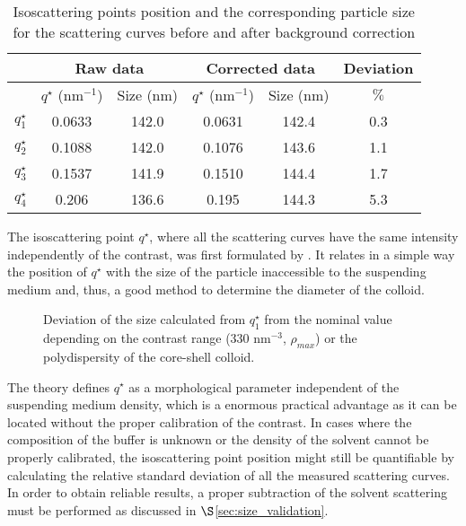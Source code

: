 \begin{table}
	\centering
	\begin{tabular}{l||cc|cc|c}
		 & \multicolumn{2}{c}{Raw data} & \multicolumn{2}{c}{Corrected data} & Deviation\\
		 \hline
		 & \( q^{\star} \) (nm\(^{-1}\))    &  Size (nm) & \( q^{\star}\) (nm\(^{-1}\))    &  Size (nm) & $\%$ \\
		\hline
		 \(q^{\star}_1\) &  0.0633 & 142.0 &  0.0631 & 142.4 & 0.3 \\
		 \(q^{\star}_2\) &  0.1088 & 142.0 &  0.1076 & 143.6 & 1.1   \\
		 \(q^{\star}_3\) &  0.1537 & 141.9 &  0.1510 & 144.4 & 1.7    \\
		 \(q^{\star}_4\) &  0.206  & 136.6 &  0.195  & 144.3 & 5.3     \\
		\end{tabular}
	\caption{Isoscattering points position and the corresponding particle size for the scattering curves before and after background correction}
	\label{tab:isoscattering_points}
\end{table}


The isoscattering point $q^{\star}$, where all the scattering curves have the same intensity independently of the contrast, was first formulated by \citep{kawaguchi_x-ray_1983-1}. It relates in a simple way the position of $q^{\star}$ with the size of the particle inaccessible to the suspending medium and, thus, a good method to determine the diameter of the colloid.

\begin{figure}%
	\centering

	\caption{Deviation of the size calculated from $q_1^{\star}$ from the nominal value depending on the contrast range (330 nm$^{-3}$, $\rho_{max}$) or the polydispersity of the core-shell colloid.}

\end{figure}

The theory defines $q^{\star}$ as a morphological parameter independent of the suspending medium density, which is a enormous practical advantage as it can be located without the proper calibration of the contrast. In cases where the composition of the buffer is unknown or the density of the solvent cannot be properly calibrated, the isoscattering point position might still be quantifiable by calculating the relative standard deviation of all the measured scattering curves. In order to obtain reliable results, a proper subtraction of the solvent scattering must be performed as discussed in $\S$\ref{sec:size_validation}.

